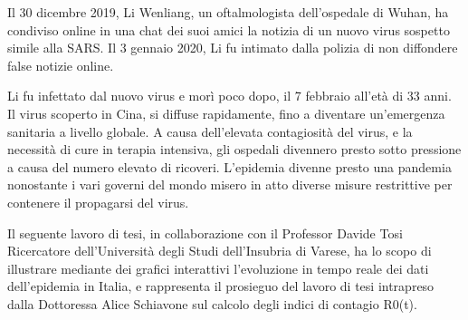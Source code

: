 
Il 30 dicembre 2019, Li Wenliang, un oftalmologista dell’ospedale di Wuhan, ha condiviso online in una chat dei suoi amici la notizia di un nuovo virus sospetto simile alla SARS.
Il 3 gennaio 2020, Li fu intimato dalla polizia di non diffondere false notizie online.

Li fu infettato dal nuovo virus e morì poco dopo, il 7 febbraio all’età di 33 anni.
Il virus scoperto in Cina, si diffuse rapidamente, fino a diventare un'emergenza sanitaria a livello globale.
A causa dell’elevata contagiosità del virus, e la necessità di cure in terapia intensiva, gli ospedali divennero presto sotto pressione a causa del numero elevato di ricoveri.
L'epidemia divenne presto una pandemia nonostante i vari governi del mondo misero in atto diverse misure restrittive per contenere il propagarsi del virus.

Il seguente lavoro di tesi, in collaborazione con il Professor Davide Tosi Ricercatore dell’Università degli Studi dell’Insubria di Varese, ha lo scopo di illustrare mediante dei grafici interattivi l’evoluzione in tempo reale dei dati dell’epidemia in Italia, e rappresenta il prosieguo del lavoro di tesi intrapreso dalla Dottoressa Alice Schiavone sul calcolo degli indici di contagio R0(t)\cite{schiavone_tesi}.